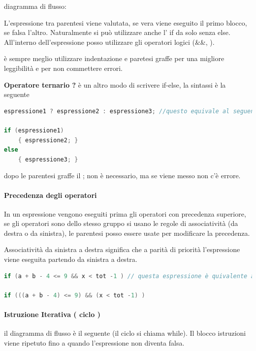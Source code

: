\documentclass[
  paper=a4,
  oneside  ,captions=tableheading
]{scrbook}
\begin{document}
diagramma di flusso:

L'espressione tra parentesi viene valutata, se vera viene eseguito il
primo blocco, se falsa l'altro. Naturalmente si può utilizzare anche l'
if da solo senza else. All'interno dell'espressione posso utilizzare gli
operatori logici (\&\&, \textbar\textbar).

è sempre meglio utilizzare indentazione e paretesi graffe per una
migliore leggibilità e per non commettere errori.

\textbf{Operatore ternario ?} è un altro modo di scrivere if-else, la
sintassi è la seguente

\begin{lstlisting}[language={C++}]
espressione1 ? espressione2 : espressione3; //questo equivale al seguente if-else

if (espressione1)
    { espressione2; }
else
    { espressione3; }
\end{lstlisting}

dopo le parentesi graffe il ; non è necessario, ma se viene messo non
c'è errore.

\hypertarget{precedenza-degli-operatori}{%
\paragraph{Precedenza degli
operatori}\label{precedenza-degli-operatori}}

In un espressione vengono eseguiti prima gli operatori con precedenza
superiore, se gli operatori sono dello stesso gruppo si usano le regole
di associatività (da destra o da sinistra), le parentesi posso essere
usate per modificare la precedenza.

Associatività da sinistra a destra significa che a parità di priorità
l'espressione viene eseguita partendo da sinistra a destra.

\begin{lstlisting}[language={C++}]
if (a + b - 4 <= 9 && x < tot -1 ) // questa espressione è quivalente a quella sotto
    
if (((a + b - 4) <= 9) && (x < tot -1) )
\end{lstlisting}

\hypertarget{istruzione-iterativa-ciclo}{%
\paragraph{Istruzione Iterativa ( ciclo
)}\label{istruzione-iterativa-ciclo}}

il diagramma di flusso è il seguente (il ciclo si chiama while). Il
blocco istruzioni viene ripetuto fino a quando l'espressione non diventa
falsa.
\end{document}
